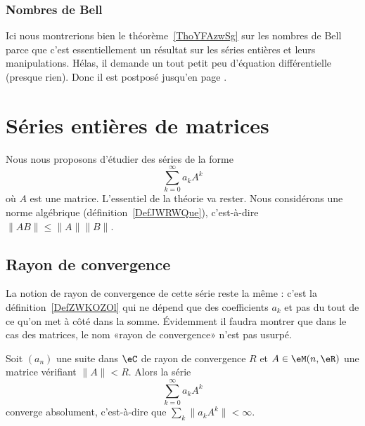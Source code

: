 \subsubsection{Nombres de Bell}

Ici nous montrerions bien le théorème~\ref{ThoYFAzwSg} sur les nombres de Bell parce que c'est essentiellement un résultat sur les séries entières et leurs manipulations. Hélas, il demande un tout petit peu d'équation différentielle (presque rien). Donc il est postposé jusqu'en page \pageref{ThoYFAzwSg}.

\section{Séries entières de matrices}
\label{secEVnZXgf}

Nous nous proposons d'étudier des séries de la forme
\begin{equation}
	\sum_{k=0}^{\infty}a_kA^k
\end{equation}
où \( A\) est une matrice. L'essentiel de la théorie va rester. Nous considérons une norme algébrique (définition~\ref{DefJWRWQue}), c'est-à-dire \( \| AB \|\leq \| A \|\| B \|\).

\subsection{Rayon de convergence}

La notion de rayon de convergence de cette série reste la même : c'est la définition~\ref{DefZWKOZOl} qui ne dépend que des coefficients \( a_k\) et pas du tout de ce qu'on met à côté dans la somme. Évidemment il faudra montrer que dans le cas des matrices, le nom «rayon de convergence» n'est pas usurpé.

\begin{proposition} \label{PropFIPooSSmJDQ}
	Soit \( (a_n)\) une suite dans \( \eC\) de rayon de convergence \( R\) et \( A\in \eM(n,\eR)\) une matrice vérifiant \( \| A \|<R\). Alors la série
	\begin{equation}
		\sum_{k=0}^{\infty}a_kA^k
	\end{equation}
	converge absolument, c'est-à-dire que \( \sum_k\| a_kA^k \|<\infty\).
\end{proposition}

